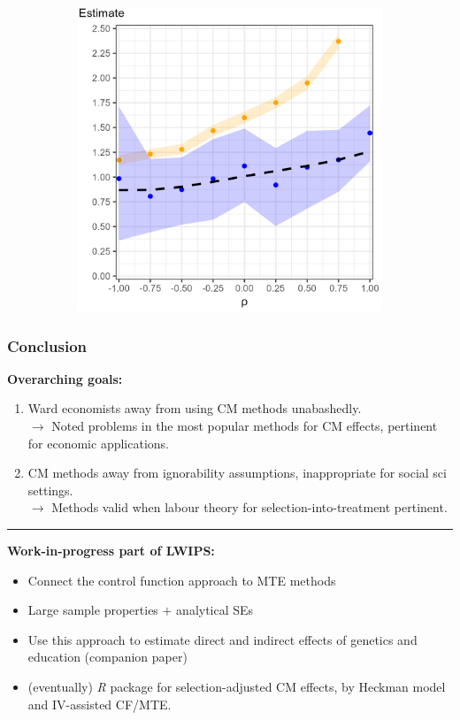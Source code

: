 \documentclass[dvipsnames]{beamer} %
\begin{document}
\begin{frame}[noframenumbering]
\begin{figure}[h!]
\begin{subfigure}[c]{0.475\textwidth}
            \includegraphics[width=\textwidth]{../programs/simulations/sim-output/rho-indirecteffect-bias.png}
        \end{subfigure}
    \end{figure}
\end{frame}
\begin{frame}
    \frametitle{Conclusion}
    \textbf{Overarching goals:}
    \begin{enumerate}
        \item Ward economists away from using CM methods unabashedly. \\ 
        $\to$ Noted problems in the most popular methods for CM effects, pertinent for economic applications.
        \item CM methods away from ignorability assumptions, inappropriate for social sci settings. \\
        $\to$ Methods valid when labour theory for selection-into-treatment pertinent.
    \end{enumerate}
    \par\noindent\rule{\textwidth}{0.4pt}
    \pause
    \textbf{Work-in-progress part of LWIPS:}
    \begin{itemize}
        \item Connect the control function approach to MTE methods
        \item Large sample properties $+$ analytical SEs
        \item Use this approach to estimate direct and indirect effects of genetics and education (companion paper)
        \item (eventually) \textit{R} package for selection-adjusted CM effects, by Heckman model and IV-assisted CF/MTE.
    \end{itemize}
\end{frame}
\end{document}
